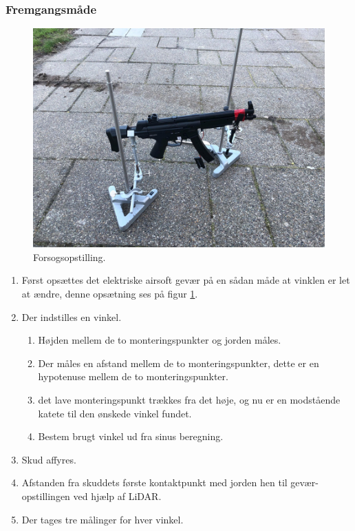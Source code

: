 \subsubsection{Fremgangsmåde}

\begin{figure}[H]
\centering
\includegraphics[scale=0.4]{Billeder/Opstilling.png}
\caption{Forsogsopstilling.}
\label{fig:Opstilling}
\end{figure}


\begin{enumerate}
\item Først opsættes det elektriske airsoft gevær på en sådan måde at vinklen er let at ændre, denne opsætning ses på figur \ref{fig:Opstilling}.

\item Der indstilles en vinkel. 
\begin{enumerate}
\item Højden mellem de to monteringspunkter og jorden måles.
\item Der måles en afstand mellem de to monteringspunkter, dette er en hypotenuse mellem de to monteringspunkter.
\item det lave monteringspunkt trækkes fra det høje, og nu er en modstående katete til den ønskede vinkel fundet.
\item Bestem brugt vinkel ud fra sinus beregning.
\end{enumerate}

\item Skud affyres.

\item Afstanden fra skuddets første kontaktpunkt med jorden hen til gevær-opstillingen ved hjælp af LiDAR.

\item Der tages tre målinger for hver vinkel.
\end{enumerate}











